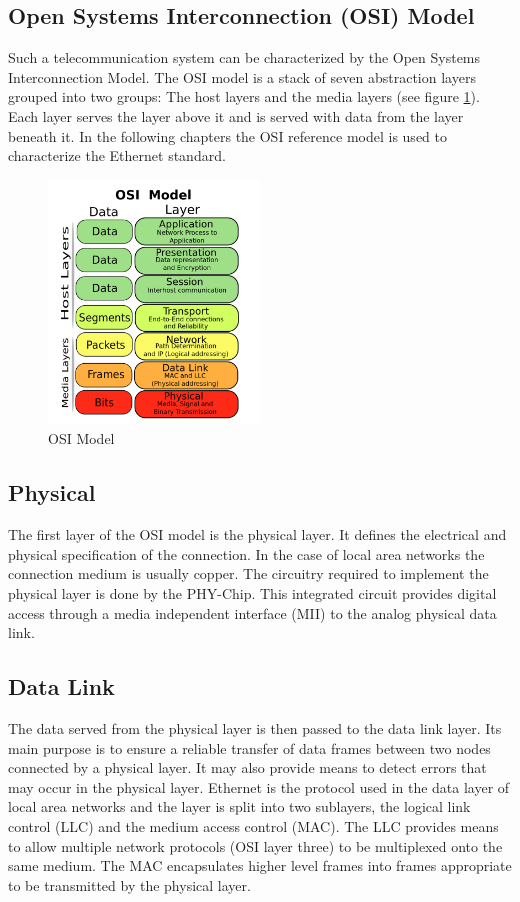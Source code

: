 \subsection{Open Systems Interconnection (OSI) Model}
Such a telecommunication system can be characterized by the Open Systems 
Interconnection Model. The OSI model is a stack of seven abstraction layers 
grouped into two groups: The host layers and the media layers (see figure \ref{fig:osi}). 
Each layer serves the layer above it and is served with data from the layer
beneath it. In the following chapters the OSI reference model is used to
characterize the Ethernet standard.

\begin{figure}[tb!]
    \centering
    \includegraphics[width=0.5\textwidth]{images/theory/osi.png}
    \caption{OSI Model \cite{osi}}
    \label{fig:osi}
\end{figure}


\subsection{Physical} \label{chapt:theory:physical}
The first layer of the OSI model is the physical layer. It defines the electrical and physical specification of the connection. In the case of local
area networks the connection medium is usually copper. The circuitry required to implement the physical layer is done by the PHY-Chip. This integrated circuit provides digital access through a media independent interface (MII) to the analog physical data link.


\subsection{Data Link} 
The data served from the physical layer is then passed to the data link layer.
Its main purpose is to ensure a reliable transfer of data frames between two
nodes connected by a physical layer. It may also provide means to detect errors
that may occur in the physical layer. Ethernet is the protocol used in the data
layer of local area networks and the layer is split into two sublayers, the logical link control (LLC) and the medium access control (MAC). The LLC provides means to allow multiple network protocols (OSI layer three) to be multiplexed onto the same medium. The MAC encapsulates higher level frames into frames appropriate to be transmitted by the physical layer.
\\

